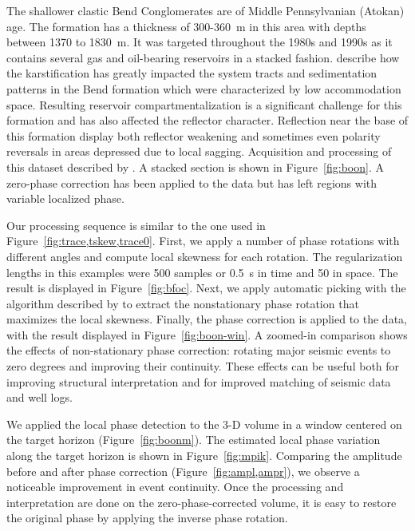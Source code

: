The shallower clastic Bend Conglomerates are of Middle Pennsylvanian
(Atokan) age. The formation has a thickness of 300-360~m in this area
with depths between 1370 to 1830~m. It was targeted throughout the
1980s and 1990s as it contains several gas and oil-bearing reservoirs
in a stacked fashion. \cite{Hardage1,Hardage2} describe how the
karstification has greatly impacted the system tracts and
sedimentation patterns in the Bend formation which were characterized
by low accommodation space. Resulting reservoir compartmentalization
is a significant challenge for this formation and has also affected
the reflector character. Reflection near the base of this formation
display both reflector weakening and sometimes even polarity reversals
in areas depressed due to local sagging. Acquisition and processing of
this dataset   described by \cite{Hardage1}. A
stacked section is shown in Figure~\ref{fig:boon}.  A zero-phase
correction has been applied to the data but has left regions with
variable localized phase.

Our processing sequence is similar to the one used in
Figure~\ref{fig:trace,tskew,trace0}. First, we apply a number of phase
rotations with different angles and compute local skewness for each
rotation. The regularization lengths in this examples were 500 samples
or 0.5~s in time and 50   in space. The
result is displayed in Figure~\ref{fig:bfoc}. Next, we apply automatic
picking with the algorithm described by \cite{avo} to extract the
nonstationary phase rotation that maximizes the local skewness.
Finally, the phase correction is applied to the data, with the result
displayed in Figure~\ref{fig:boon-win}. A zoomed-in comparison shows
the effects of non-stationary phase correction: rotating major seismic
events to zero degrees and improving their continuity. These effects
can be useful both for improving structural interpretation and for
improved matching of seismic data and well logs.


We applied the local phase detection to the 3-D volume in a window
centered on the target horizon (Figure~\ref{fig:boonm}). The estimated
local phase variation along the target horizon is shown in
Figure~\ref{fig:mpik}. Comparing the amplitude before and after phase
correction (Figure~\ref{fig:ampl,ampr}), we observe a noticeable
improvement in event continuity. Once the processing and
interpretation are done on the zero-phase-corrected volume, it is easy
to restore the original phase by applying the inverse phase rotation.

